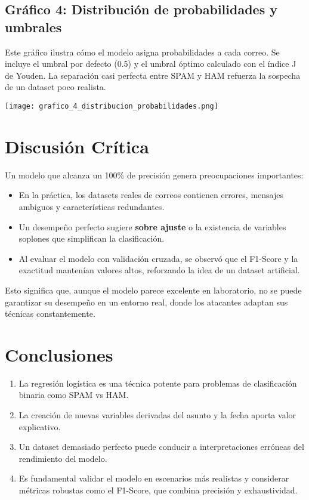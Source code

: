 \documentclass[12pt,a4paper]{article}
\begin{document}
\subsection{Gráfico 4: Distribución de probabilidades y umbrales}
Este gráfico ilustra cómo el modelo asigna probabilidades a cada correo. Se incluye el umbral por defecto (0.5) y el umbral óptimo calculado con el índice J de Youden. La separación casi perfecta entre SPAM y HAM refuerza la sospecha de un dataset poco realista.

\texttt{[image: grafico\_4\_distribucion\_probabilidades.png]}

\section{Discusión Crítica}
Un modelo que alcanza un 100\% de precisión genera preocupaciones importantes:

\begin{itemize}
    \item En la práctica, los datasets reales de correos contienen errores, mensajes ambiguos y características redundantes.
    \item Un desempeño perfecto sugiere \textbf{sobre ajuste} o la existencia de variables soplones que simplifican la clasificación.
    \item Al evaluar el modelo con validación cruzada, se observó que el F1-Score y la exactitud mantenían valores altos, reforzando la idea de un dataset artificial.
\end{itemize}

Esto significa que, aunque el modelo parece excelente en laboratorio, no se puede garantizar su desempeño en un entorno real, donde los atacantes adaptan sus técnicas constantemente.

\section{Conclusiones}
\begin{enumerate}
    \item La regresión logística es una técnica potente para problemas de clasificación binaria como SPAM vs HAM.
    \item La creación de nuevas variables derivadas del asunto y la fecha aporta valor explicativo.
    \item Un dataset demasiado perfecto puede conducir a interpretaciones erróneas del rendimiento del modelo.
    \item Es fundamental validar el modelo en escenarios más realistas y considerar métricas robustas como el F1-Score, que combina precisión y exhaustividad.
\end{enumerate}
\end{document}
